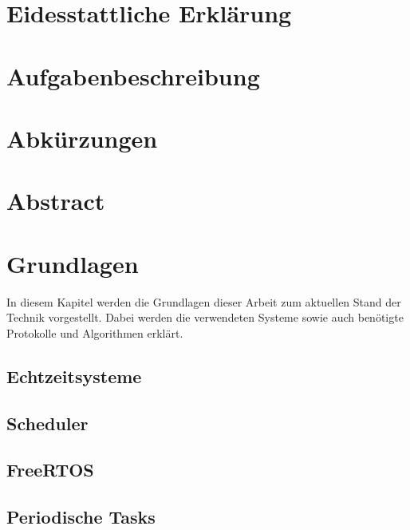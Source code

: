 \documentclass{scrartcl}
\begin{document}
	\begin{titlepage}
		
	\end{titlepage}
	\clearpage 
	\setcounter{page}{1}
	\section{Eidesstattliche Erklärung}
		
		\clearpage
	\section{Aufgabenbeschreibung}
		
		\clearpage
	\tableofcontents
	\clearpage
	\listoffigures
	\listoftables
	\clearpage
	\lstlistoflistings
	\clearpage
	\section{Abkürzungen}
		
		\clearpage
	\section{Abstract}
		
	\clearpage
{}
\setcounter{page}{1}
	\section{Grundlagen}
		In diesem Kapitel werden die Grundlagen dieser Arbeit zum aktuellen Stand der Technik vorgestellt.
		Dabei werden die verwendeten Systeme sowie auch benötigte Protokolle und Algorithmen erklärt.
		\subsection{Echtzeitsysteme} \label{section:echtzeitsysteme}
			
		\subsection{Scheduler} \label{section:scheduler}
			
		\subsection{FreeRTOS} \label{section:freertos}
			
		\subsection{Periodische Tasks} \label{section:periodische_tasks}
			
			\clearpage
\end{document}
